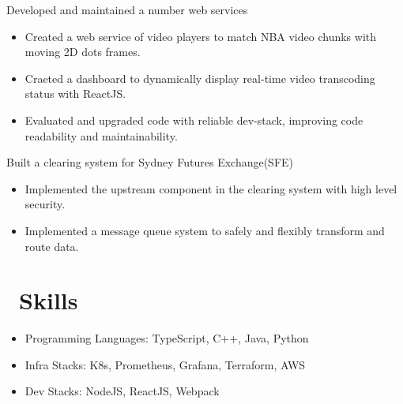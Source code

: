 \documentclass{resume}
\begin{document}
Developed and maintained a number web services
\begin{itemize}
  \item Created a web service of video players to match NBA video chunks with moving 2D dots frames.
  \item Craeted a dashboard to dynamically display real-time video transcoding status with ReactJS.
  \item Evaluated and upgraded code with reliable dev-stack, improving code readability and maintainability.
\end{itemize}

Built a clearing system for Sydney Futures Exchange(SFE)
\begin{itemize}
  \item Implemented the upstream component in the clearing system with high level security.
  \item Implemented a message queue system to safely and flexibly transform and route data.
\end{itemize}


\section{\faCogs\ Skills}
\begin{itemize}[parsep=0.5ex]
  \item Programming Languages: TypeScript, C++, Java, Python
  \item Infra Stacks: K8s, Prometheus, Grafana, Terraform, AWS
  \item Dev Stacks: NodeJS, ReactJS, Webpack
\end{itemize}



%
%
\end{document}
